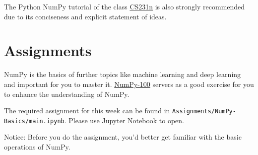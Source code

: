 \documentclass[english]{../TexTemplate/thesis}
\begin{document}
The Python NumPy tutorial of the class \href{https://cs231n.github.io/python-numpy-tutorial/}{CS231n} is also strongly recommended due to its conciseness and explicit statement of ideas.

\section{Assignments}
NumPy is the basics of further topics like machine learning and deep learning and important for you to master it.
\href{https://github.com/rougier/numpy-100}{NumPy-100} servers as a good exercise for you to enhance the understanding of NumPy.

The required assignment for this week can be found in \verb'Assignments/NumPy-Basics/main.ipynb'. Please use Jupyter Notebook to open.

Notice: Before you do the assignment, you'd better get familiar with the basic operations of NumPy.
\end{document}
